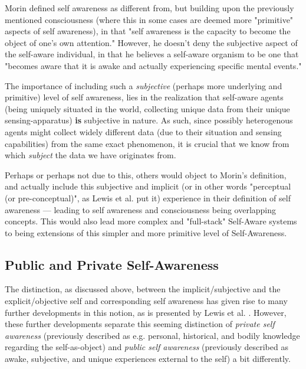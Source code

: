 	Morin defined self awareness as different from, but building upon the previously mentioned consciousness (where this in some cases are deemed more "primitive" aspects of self awareness), in that "self awareness is the capacity to become the object of one's own attention." However, he doesn't deny the subjective aspect of the self-aware individual, in that he believes a self-aware organism to be one that "becomes aware that it is awake and actually experiencing specific mental events."

	The importance of including such a \textit{subjective} (perhaps more underlying and primitive) level of self awareness, lies in the realization that self-aware agents (being uniquely situated in the world, collecting unique data from their unique sensing-apparatus) \textbf{is} subjective in nature. As such, since possibly heterogenous agents might collect widely different data (due to their situation and sensing capabilities) from the same exact phenomenon, it is crucial that we know from which \textit{subject} the data we have originates from.

	Perhaps or perhaps not due to this, others would object to Morin's definition, and actually include this subjective and implicit (or in other words "perceptual (or pre-conceptual)", as Lewis et al. \cite{sacs16_ch2} put it) experience in their definition of self awareness — leading to self awareness and consciousness being overlapping concepts. This would also lead more complex and "full-stack" Self-Aware systems to being extensions of this simpler and more primitive level of Self-Awareness.


	\subsection{Public and Private Self-Awareness}
	\label{subsec:public_private_SA}

	The distinction, as discussed above, between the implicit/subjective and the explicit/objective self and corresponding self awareness has given rise to many further developments in this notion, as is presented by Lewis et al. \cite{sacs16_ch2}. However, these further developments separate this seeming distinction of \textit{private self awareness} (previously described as e.g. personal, historical, and bodily knowledge regarding the self-as-object) and \textit{public self awareness} (previously described as awake, subjective, and unique experiences external to the self) a bit differently.

